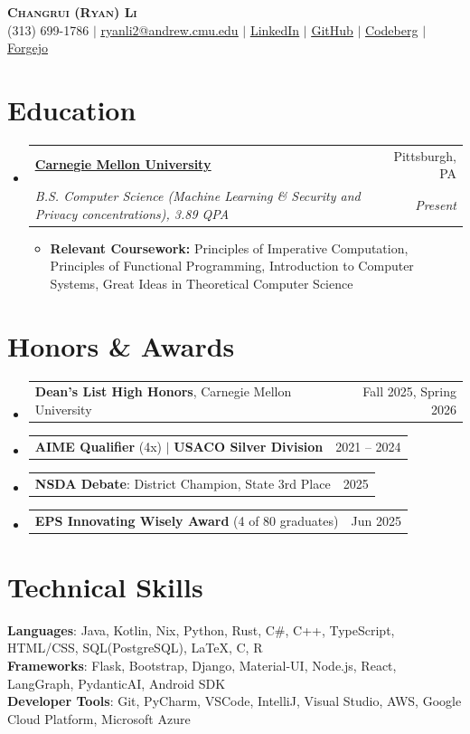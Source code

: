 \documentclass[letterpaper,11pt]{article}
\makeatletter
\newcommand{\resumeSubheading}[4]{
  \vspace{-2pt}\item
    \begin{tabular*}{0.97\textwidth}[t]{l@{\extracolsep{\fill}}r}
      \textbf{#1} & #2 \\
      \textit{\small#3} & \textit{\small #4} \\
    \end{tabular*}\vspace{-7pt}
}
\newcommand{\resumeAwardHeading}[2]{
    \item
    \begin{tabular*}{0.97\textwidth}{l@{\extracolsep{\fill}}r}
      \small#1 & #2 \\
    \end{tabular*}\vspace{-7pt}
}
\newcommand{\resumeSubHeadingListStart}{\begin{itemize}[leftmargin=0.15in, label={}]}
\newcommand{\resumeSubHeadingListEnd}{\end{itemize}}
\newcommand{\resumeItemListStart}{\begin{itemize}}
\newcommand{\resumeItemListEnd}{\end{itemize}\vspace{-5pt}}
\makeatother
\begin{document}
\begin{center}
    \textbf{\Huge \scshape Changrui (Ryan) Li} \\ \vspace{1pt}
    \small (313) 699-1786 $|$ \href{mailto:ryanli2@andrew.cmu.edu}{\underline{ryanli2@andrew.cmu.edu}} $|$ \href{https://www.linkedin.com/in/ryan-li-ab139919b/}{\underline{LinkedIn}} $|$
    \href{https://github.com/thesuperRL}{\underline{GitHub}} $|$
    \href{https://codeberg.org/thesuperRL}{\underline{Codeberg}} $|$
    \href{https://git.cmu.dev/thesuperRL}{\underline{Forgejo}}
\end{center}

\section{Education}
  \resumeSubHeadingListStart
      \resumeSubheading
              {\href{https://www.cmu.edu/}{\underline{Carnegie Mellon University}} }{Pittsburgh, PA}
              {B.S. Computer Science (Machine Learning \& Security and Privacy concentrations), 3.89 QPA}{Present}
              \resumeItemListStart
                  \item{
                    \textbf{Relevant Coursework:} Principles of Imperative Computation, Principles of Functional Programming, Introduction to Computer Systems, Great Ideas in Theoretical Computer Science
                    }
              \resumeItemListEnd

  \resumeSubHeadingListEnd

\section{Honors \& Awards}
  \resumeSubHeadingListStart
    \resumeAwardHeading{\textbf{Dean's List High Honors}, Carnegie Mellon University}{Fall 2025, Spring 2026}
    \resumeAwardHeading{\textbf{AIME Qualifier} (4x) $|$ \textbf{USACO Silver Division}}{2021 -- 2024}
    \resumeAwardHeading{\textbf{NSDA Debate}: District Champion, State 3rd Place}{2025}
    \resumeAwardHeading{\textbf{EPS Innovating Wisely Award} (4 of 80 graduates)}{Jun 2025}
  \resumeSubHeadingListEnd

\section{Technical Skills}
 \begin{itemize}[leftmargin=0.15in, label={}]
    \small{\item{
     \textbf{Languages}{: Java, Kotlin, Nix, Python, Rust, C\#, C++, TypeScript, HTML/CSS, SQL(PostgreSQL), \LaTeX, C, R} \\
     \textbf{Frameworks}{: Flask, Bootstrap, Django, Material-UI, Node.js, React, LangGraph, PydanticAI, Android SDK} \\
     \textbf{Developer Tools}{: Git, PyCharm, VSCode, IntelliJ, Visual Studio, AWS, Google Cloud Platform, Microsoft Azure} \\
    }}
 \end{itemize}
\end{document}
